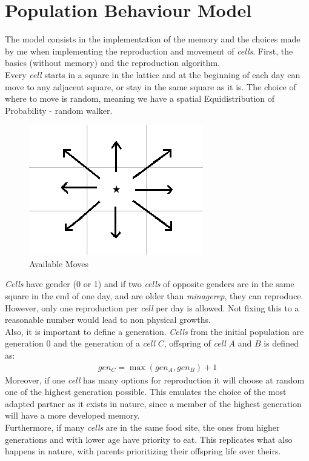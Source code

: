 \documentclass[a4paper,prd,twocolumn,nofootinbib,superscriptaddress,floatfix]{revtex4}
\begin{document}
\section{Population Behaviour Model}
The model consists in the implementation of the memory and the choices made by me when implementing the reproduction and movement of \textit{cells}. First, the basics (without memory) and the reproduction algorithm.\\

Every \textit{cell} starts in a square in the lattice and at the beginning of each day can move to any adjacent square, or stay in the same square as it is. The choice of where to move is random, meaning we have a spatial Equidistribution of Probability - random walker.\\
\begin{figure}[H]
\centering
  \includegraphics[scale=0.3]{move.png}
\caption{Available Moves}
  \label{fig:2}
\end{figure}



\textit{Cells} have gender (0 or 1) and if two \textit{cells} of opposite genders are in the same square in the end of one day, and are older than \textit{minagerep}, they can reproduce. However, only one reproduction per \textit{cell} per day is allowed. Not fixing this to a reasonable number would lead to non physical growths.\\
Also, it is important to define a generation. \textit{Cells} from the initial population are generation 0 and the generation of a \textit{cell} $C$, offspring of \textit{cell} $A$ and $B$ is defined as:
\begin{align*}
gen_C=\max(gen_A,gen_B)+1
\end{align*}
Moreover, if one \textit{cell} has many options for reproduction it will choose at random one of the highest generation possible. This emulates the choice of the most adapted partner as it exists in nature, since a member of the highest generation will have a more developed memory.\\
Furthermore, if many \textit{cells} are in the same food site, the ones from higher generations and with lower age have priority to eat. This replicates what also happens in nature, with parents prioritizing their offspring life over theirs.
\end{document}
